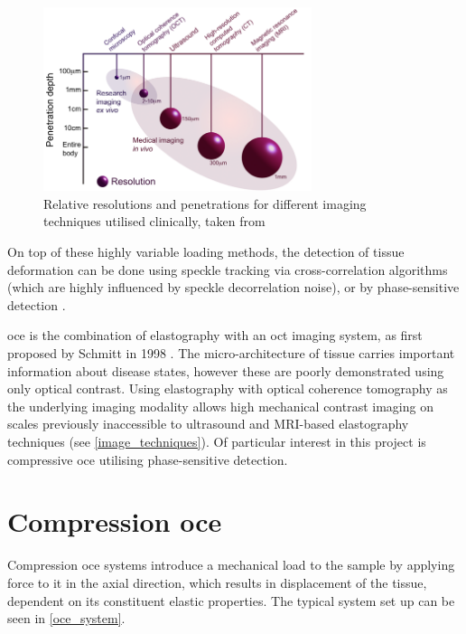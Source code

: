 \begin{figure}[t]
	\centering
    	\includegraphics[width=0.7\textwidth]{bground_figs/technique_comparison.png}
    	\caption{Relative resolutions and penetrations for different imaging techniques utilised clinically, taken from \cite{optical+biomedical_engineering_laboratory_introduction_nodate}}
    	\label{image_techniques}	
\end{figure}

On top of these highly variable loading methods, the detection of tissue deformation can be done using speckle tracking via cross-correlation algorithms (which are highly influenced by speckle decorrelation noise), or by phase-sensitive detection \cite{kennedy_strain_2012}.

\ac{oce} is the combination of elastography with an \ac{oct} imaging system, as first proposed by Schmitt in 1998 \cite{schmitt_oct_1998}. The micro-architecture of tissue carries important information about disease states, however these are poorly demonstrated using only optical contrast. Using elastography with optical coherence tomography as the underlying imaging modality allows high mechanical contrast imaging on scales previously inaccessible to ultrasound and MRI-based elastography techniques (see \autoref{image_techniques}). Of particular interest in this project is compressive \ac{oce} utilising phase-sensitive detection. 

\section{Compression \ac{oce}}\label{compression_oce}    

Compression \ac{oce} systems introduce a mechanical load to the sample by applying force to it in the axial direction, which results in displacement of the tissue, dependent on its constituent elastic properties. The typical system set up can be seen in \autoref{oce_system}.

